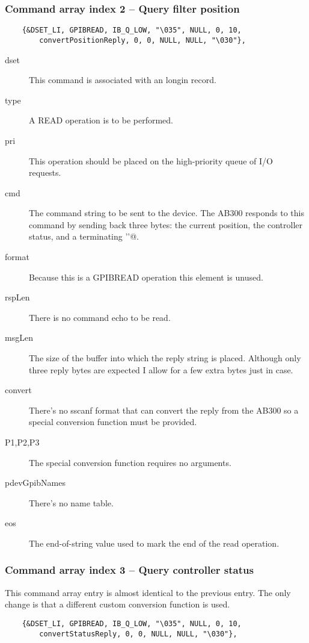 \documentclass[twoside]{article}
\begin{document}
\subsubsection{Command array index 2 -- Query filter position}
\begin{verbatim}
    {&DSET_LI, GPIBREAD, IB_Q_LOW, "\035", NULL, 0, 10,
        convertPositionReply, 0, 0, NULL, NULL, "\030"},
\end{verbatim}
\begin{description}
\item[dset] This command is associated with an longin record.
\item[type] A READ operation is to be performed.
\item[pri] This operation should be placed on the high-priority queue
of I/O requests.
\item[cmd] The command string to be sent to the device.
The AB300 responds to this command by sending back three bytes: the current
position, the controller status, and a terminating \verb@''@.
\item[format] Because this is a GPIBREAD operation this element is unused.
\item[rspLen] There is no command echo to be read.
\item[msgLen] The size of the buffer into which the reply string is placed. 
Although only three reply bytes are
expected I allow for a few extra bytes just in case.
\item[convert] There's no sscanf format that can convert the reply from the
AB300 so a special conversion function must be provided.
\item[P1,P2,P3] The special conversion function requires no arguments.
\item[pdevGpibNames] There's no name table.
\item[eos] The end-of-string value used to mark the end of the read operation.
\end{description}



\subsubsection{Command array index 3 -- Query controller status}
This command array entry is almost identical to the previous entry.  The
only change is that a different custom conversion function is used.
\begin{verbatim}
    {&DSET_LI, GPIBREAD, IB_Q_LOW, "\035", NULL, 0, 10,
        convertStatusReply, 0, 0, NULL, NULL, "\030"},
\end{verbatim}
\end{document}
